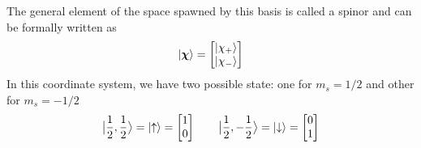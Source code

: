 \documentclass[../../../main.tex]{subfiles}
\begin{document}
The general element of the space spawned by this basis is called a spinor and can be formally written as
\begin{equation*}
    \ket{\boldsymbol{\chi}}= \begin{bmatrix}
        \ket{\chi_+} \\
        \ket{\chi_-}
    \end{bmatrix}
\end{equation*}
In this coordinate system, we have two possible state: one for $m_s=1/2$ and other for $m_s=-1/2$
\begin{equation*}
    \big| \frac{1 }{2 },\frac{1 }{2 }\big\rangle = \ket{\uparrow} = \begin{bmatrix} 1\\0 \end{bmatrix}\qquad
    \big| \frac{1 }{2 },-\frac{1 }{2 }\big\rangle = \ket{\downarrow} = \begin{bmatrix} 0\\1 \end{bmatrix}
\end{equation*}
\end{document}
